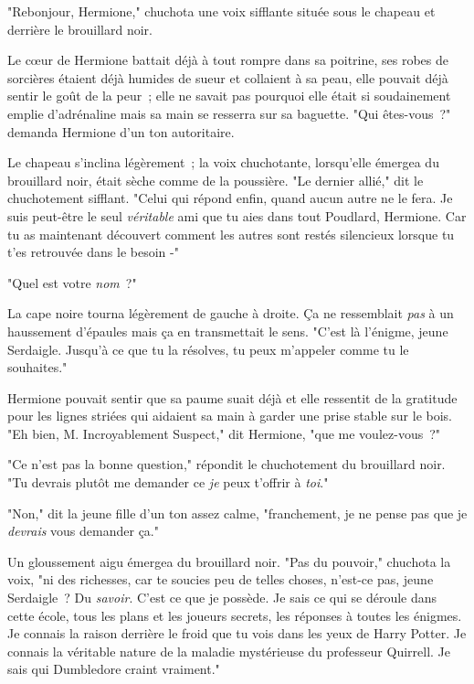 "Rebonjour, Hermione," chuchota une voix sifflante située sous le chapeau et derrière le brouillard noir.

Le cœur de Hermione battait déjà à tout rompre dans sa poitrine, ses robes de sorcières étaient déjà humides de sueur et collaient à sa peau, elle pouvait déjà sentir le goût de la peur~; elle ne savait pas pourquoi elle était si soudainement emplie d'adrénaline mais sa main se resserra sur sa baguette. "Qui êtes-vous~?" demanda Hermione d'un ton autoritaire.

Le chapeau s'inclina légèrement~; la voix chuchotante, lorsqu'elle émergea du brouillard noir, était sèche comme de la poussière. "Le dernier allié," dit le chuchotement sifflant. "Celui qui répond enfin, quand aucun autre ne le fera. Je suis peut-être le seul \emph{véritable} ami que tu aies dans tout Poudlard, Hermione. Car tu as maintenant découvert comment les autres sont restés silencieux lorsque tu t'es retrouvée dans le besoin -"

"Quel est votre \emph{nom}~?"

La cape noire tourna légèrement de gauche à droite. Ça ne ressemblait \emph{pas} à un haussement d'épaules mais ça en transmettait le sens. "C'est là l'énigme, jeune Serdaigle. Jusqu'à ce que tu la résolves, tu peux m'appeler comme tu le souhaites."

Hermione pouvait sentir que sa paume suait déjà et elle ressentit de la gratitude pour les lignes striées qui aidaient sa main à garder une prise stable sur le bois. "Eh bien, M. Incroyablement Suspect," dit Hermione, "que me voulez-vous~?"

"Ce n'est pas la bonne question," répondit le chuchotement du brouillard noir. "Tu devrais plutôt me demander ce \emph{je} peux t'offrir à \emph{toi}."

"Non," dit la jeune fille d'un ton assez calme, "franchement, je ne pense pas que je \emph{devrais} vous demander ça."

Un gloussement aigu émergea du brouillard noir. "Pas du pouvoir," chuchota la voix, "ni des richesses, car te soucies peu de telles choses, n'est-ce pas, jeune Serdaigle~? Du \emph{savoir}. C'est ce que je possède. Je sais ce qui se déroule dans cette école, tous les plans et les joueurs secrets, les réponses à toutes les énigmes. Je connais la raison derrière le froid que tu vois dans les yeux de Harry Potter. Je connais la véritable nature de la maladie mystérieuse du professeur Quirrell. Je sais qui Dumbledore craint vraiment."


